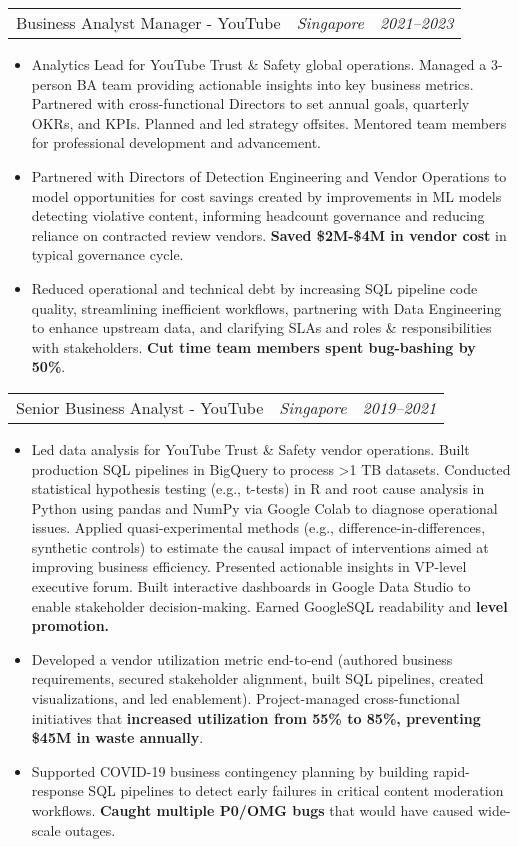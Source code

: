 \documentclass[letterpaper,11pt]{article}
\makeatletter
\newcommand{\resumeItem}[1]{
  \item\small{
    {#1}
  }
}
\newcommand{\resumePosition}[3]{
  \item
    \begin{tabular*}{0.96\textwidth}[t]{p{9cm}p{6cm}@{\extracolsep{\fill}}r}
      #1 & \textit{#2} & \textit{#3} \\
    \end{tabular*}
}
\newcommand{\resumeItemListStart}{\begin{itemize}[label=-]}
\newcommand{\resumeItemListEnd}{\end{itemize}}
\makeatother
\begin{document}
          \resumePosition{Business Analyst Manager - YouTube}{Singapore}{2021–2023}
            \resumeItemListStart
              \resumeItem{Analytics Lead for YouTube Trust \& Safety global operations. Managed a 3-person BA team providing actionable insights into key business metrics. Partnered with cross-functional Directors to set annual goals, quarterly OKRs, and KPIs. Planned and led strategy offsites. Mentored team members for professional development and advancement.}
              \resumeItem{Partnered with Directors of Detection Engineering and Vendor Operations to model opportunities for cost savings created by improvements in ML models detecting violative content, informing headcount governance and reducing reliance on contracted review vendors. \textbf{Saved \$2M-\$4M in vendor cost} in typical governance cycle.}
              \resumeItem{Reduced operational and technical debt by increasing SQL pipeline code quality, streamlining inefficient workflows, partnering with Data Engineering to enhance upstream data, and clarifying SLAs and roles \& responsibilities with stakeholders. \textbf{Cut time team members spent bug-bashing by 50\%}.}
            \resumeItemListEnd
    
          \resumePosition{Senior Business Analyst - YouTube}{Singapore}{2019–2021}
            \resumeItemListStart
              \resumeItem{Led data analysis for YouTube Trust \& Safety vendor operations. Built production SQL pipelines in BigQuery to process \textgreater 1 TB datasets. Conducted statistical hypothesis testing (e.g., t-tests) in R and root cause analysis in Python using pandas and NumPy via Google Colab to diagnose operational issues. Applied quasi-experimental methods (e.g., difference-in-differences, synthetic controls) to estimate the causal impact of interventions aimed at improving business efficiency. Presented actionable insights in VP-level executive forum. Built interactive dashboards in Google Data Studio to enable stakeholder decision-making. Earned GoogleSQL readability and \textbf{level promotion.}}
              \resumeItem{Developed a vendor utilization metric end-to-end (authored business requirements, secured stakeholder alignment, built SQL pipelines, created visualizations, and led enablement). Project-managed cross-functional initiatives that \textbf{increased utilization from 55\% to 85\%, preventing \$45M in waste annually}.}
              \resumeItem{Supported COVID-19 business contingency planning by building rapid-response SQL pipelines to detect early failures in critical content moderation workflows. \textbf{Caught multiple P0/OMG bugs} that would have caused wide-scale outages.}
            \resumeItemListEnd
        
\end{document}
